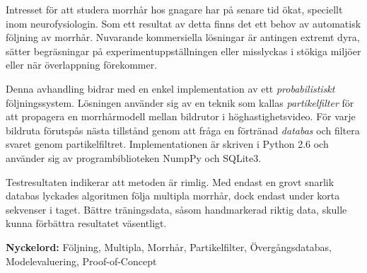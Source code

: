 
Intresset för att studera morrhår hos gnagare har på senare tid ökat, speciellt inom neurofysiologin.
Som ett resultat av detta finns det ett behov av automatisk följning av morrhår.
Nuvarande kommersiella lösningar är antingen extremt dyra, sätter begräsningar på experimentuppställningen
eller misslyckas i stökiga miljöer eller när överlappning förekommer.

Denna avhandling bidrar med en enkel implementation av ett \emph{probabilistiskt} följningssystem. 
Lösningen använder sig av 
en teknik som kallas \emph{partikelfilter} för att propagera en morrhårmodell mellan bildrutor 
i höghastighetsvideo.
För varje bildruta förutspås nästa tillstånd genom att fråga en förtränad \emph{databas} 
och filtera svaret genom partikelfiltret. 
Implementationen är skriven i Python 2.6 och använder sig av programbiblioteken NumpPy och SQLite3.

Testresultaten indikerar att metoden är rimlig. 
Med endast en grovt snarlik databas lyckades algoritmen 
följa multipla morrhår, dock endast under korta sekvenser i taget. 
Bättre träningsdata, såsom handmarkerad riktig data, skulle kunna förbättra resultatet väsentligt.


\textbf{Nyckelord:} Följning, Multipla, Morrhår, Partikelfilter, Övergångsdatabas, Modelevaluering, Proof-of-Concept

